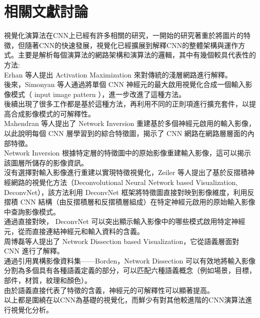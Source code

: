 \chapter{相關文獻討論}
\label{c:2}
視覺化演算法在CNN上已經有許多相關的研究，一開始的研究著重於將圖片的特徵，但隨著CNN的快速發展，視覺化已經擴展到解釋CNN的整體架構與運作方式。主要是解析每個演算法的網路架構和演算法的邏輯，其中有幾個較具代表性的方法:\\
Erhan 等人提出 Activation Maximization 來對傳統的淺層網路進行解釋。\\
後來，Simonyan 等人通過將單個 CNN 神經元的最大啟用視覺化合成一個輸入影像模式（ input image pattern ），進一步改進了這種方法。\\
後續出現了很多工作都是基於這種方法，再利用不同的正則項進行擴充套件，以提高合成影像模式的可解釋性。\\
Mahendran 等人提出了 Network Inversion 重建基於多個神經元啟用的輸入影像，以此說明每個 CNN 層學習到的綜合特徵圖，揭示了 CNN 網路在網路層層面的內部特徵。\\
Network Inversion 根據特定層的特徵圖中的原始影像重建輸入影像，這可以揭示該圖層所儲存的影像資訊。\\
沒有選擇對輸入影像進行重建以實現特徵視覺化，Zeiler 等人提出了基於反摺積神經網路的視覺化方法（Deconvolutional Neural Network based Visualization, DeconvNet），該方法利用 DeconvNet 框架將特徵圖直接對映到影像維度，利用反摺積 CNN 結構（由反摺積層和反摺積層組成）在特定神經元啟用的原始輸入影像中查詢影像模式。
\\通過直接對映， DeconvNet 可以突出顯示輸入影像中的哪些模式啟用特定神經元，從而直接連結神經元和輸入資料的含義。\\
周博磊等人提出了 Network Dissection based Visualization，它從語義層面對 CNN 進行了解釋。\\
通過引用異構影像資料集——Borden，Network Dissection 可以有效地將輸入影像分割為多個具有各種語義定義的部分，可以匹配六種語義概念（例如場景，目標，部件，材質，紋理和顏色）。\\
由於語義直接代表了特徵的含義，神經元的可解釋性可以顯著提高。\\
以上都是圍繞在以CNN為基礎的視覺化，而鮮少有對其他較進階的CNN演算法進行視覺化分析。



